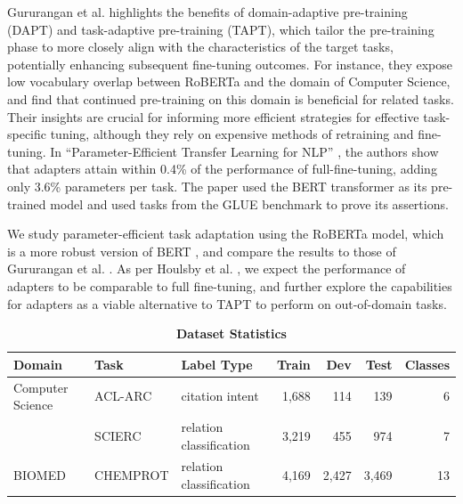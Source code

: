 \documentclass[10pt,twocolumn,letterpaper]{article}
\begin{document}
Gururangan et al. \cite{gururangan2020dont} highlights the benefits of domain-adaptive pre-training (DAPT) and task-adaptive pre-training (TAPT), which tailor the pre-training phase to more closely align with the characteristics of the target tasks, potentially enhancing subsequent fine-tuning outcomes. For instance, they expose low vocabulary overlap between RoBERTa and the domain of Computer Science, and find that continued pre-training on this domain is beneficial for related tasks. Their insights are crucial for informing more efficient strategies for effective task-specific tuning, although they rely on expensive methods of retraining and fine-tuning. In “Parameter-Efficient Transfer Learning for NLP” \cite{houlsby2019parameter}, the authors show that adapters attain within 0.4\% of the performance of full-fine-tuning, adding only 3.6\% parameters per task. The paper used the BERT transformer as its pre-trained model and used tasks from the GLUE benchmark to prove its assertions. 

We study parameter-efficient task adaptation using the RoBERTa model, which is a more robust version of BERT \cite{liu2019roberta}, and compare the results to those of Gururangan et al. \cite{gururangan2020dont}. As per Houlsby et al. \cite{houlsby2019parameter}, we expect the performance of adapters to be comparable to full fine-tuning, and further explore the capabilities for adapters as a viable alternative to TAPT to perform on out-of-domain tasks.

\begin{table}[h]
    \centering
    \begin{tabular}{ l l l r r r r }
      \hline
      \textbf{Domain} & \textbf{Task} & \textbf{Label Type} & \textbf{Train} & \textbf{Dev}   & \textbf{Test}  & \textbf{Classes} \\
      \hline
      Computer Science & ACL-ARC & citation intent & 1,688 & 114   & 139   & 6 \\
                       & SCIERC  & relation classification & 3,219 & 455   & 974   & 7 \\
      \hline
      BIOMED           & CHEMPROT & relation classification & 4,169 & 2,427 & 3,469 & 13 \\
      \hline
    \end{tabular}%
    \caption{\textbf{Dataset Statistics}}
    \label{tab:dataset-stats}%
  \end{table}%

\end{document}
